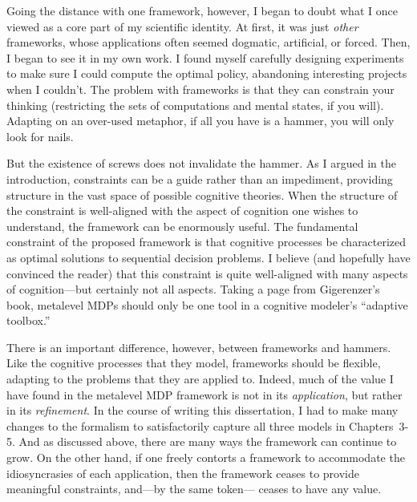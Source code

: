 Going the distance with one framework, however, I began to doubt what I once viewed as a core part of my scientific identity. At first, it was just \emph{other} frameworks, whose applications often seemed dogmatic, artificial, or forced. Then, I began to see it in my own work. I found myself carefully designing experiments to make sure I could compute the optimal policy, abandoning interesting projects when I couldn't. The problem with frameworks is that they can constrain your thinking (restricting the sets of computations and mental states, if you will). Adapting on an over-used metaphor, if all you have is a hammer, you will only look for nails.


But the existence of screws does not invalidate the hammer. As I argued in the introduction, constraints can be a guide rather than an impediment, providing structure in the vast space of possible cognitive theories. When the structure of the constraint is well-aligned with the aspect of cognition one wishes to understand, the framework can be enormously useful. The fundamental constraint of the proposed framework is that cognitive processes be characterized as optimal solutions to sequential decision problems. I believe (and hopefully have convinced the reader) that this constraint is quite well-aligned with many aspects of cognition---but certainly not all aspects. Taking a page from Gigerenzer's book, metalevel MDPs should only be one tool in a cognitive modeler's ``adaptive toolbox.''

There is an important difference, however, between frameworks and hammers. Like the cognitive processes that they model, frameworks should be flexible, adapting to the problems that they are applied to. Indeed, much of the value I have found in the metalevel MDP framework is not in its \emph{application}, but rather in its \emph{refinement}. In the course of writing this dissertation, I had to make many changes to the formalism to satisfactorily capture all three models in Chapters~3-5. And as discussed above, there are many ways the framework can continue to grow. On the other hand, if one freely contorts a framework to accommodate the idiosyncrasies of each application, then the framework ceases to provide meaningful constraints, and---by the same token--- ceases to have any value.

